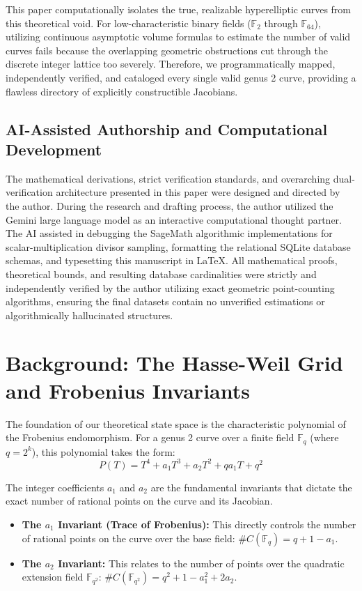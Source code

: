 \documentclass[12pt]{article}
\begin{document}
This paper computationally isolates the true, realizable hyperelliptic curves from this theoretical void. For low-characteristic binary fields ($\mathbb{F}_2$ through $\mathbb{F}_{64}$), utilizing continuous asymptotic volume formulas to estimate the number of valid curves fails because the overlapping geometric obstructions cut through the discrete integer lattice too severely. Therefore, we programmatically mapped, independently verified, and cataloged every single valid genus 2 curve, providing a flawless directory of explicitly constructible Jacobians.

\subsection{AI-Assisted Authorship and Computational Development}
The mathematical derivations, strict verification standards, and overarching dual-verification architecture presented in this paper were designed and directed by the author. During the research and drafting process, the author utilized the Gemini large language model \cite{Gemini2026} as an interactive computational thought partner. The AI assisted in debugging the SageMath algorithmic implementations for scalar-multiplication divisor sampling, formatting the relational SQLite database schemas, and typesetting this manuscript in \LaTeX. All mathematical proofs, theoretical bounds, and resulting database cardinalities were strictly and independently verified by the author utilizing exact geometric point-counting algorithms, ensuring the final datasets contain no unverified estimations or algorithmically hallucinated structures.

\section{Background: The Hasse-Weil Grid and Frobenius Invariants}
The foundation of our theoretical state space is the characteristic polynomial of the Frobenius endomorphism. For a genus 2 curve over a finite field $\mathbb{F}_q$ (where $q = 2^k$), this polynomial takes the form:
\[ P(T) = T^4 + a_1 T^3 + a_2 T^2 + q a_1 T + q^2 \]

The integer coefficients $a_1$ and $a_2$ are the fundamental invariants that dictate the exact number of rational points on the curve and its Jacobian. 
\begin{itemize}
    \item \textbf{The $a_1$ Invariant (Trace of Frobenius):} This directly controls the number of rational points on the curve over the base field: $\#C(\mathbb{F}_q) = q + 1 - a_1$.
    \item \textbf{The $a_2$ Invariant:} This relates to the number of points over the quadratic extension field $\mathbb{F}_{q^2}$: $\#C(\mathbb{F}_{q^2}) = q^2 + 1 - a_1^2 + 2a_2$.
\end{itemize}
\end{document}

